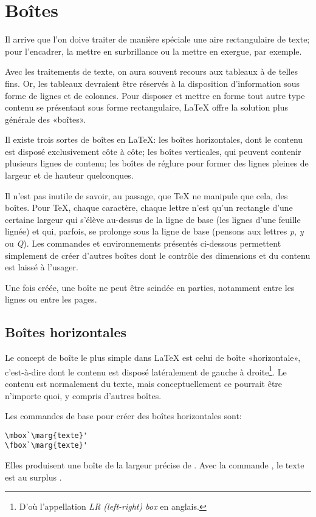 \chapter{Boîtes}
\label{chap:boites}

Il arrive que l'on doive traiter de manière spéciale une aire
rectangulaire de texte; pour l'encadrer, la mettre en surbrillance ou
la mettre en exergue, par exemple.

Avec les traitements de texte, on aura souvent recours aux tableaux à
de telles fins. Or, les tableaux devraient être réservés à la
disposition d'information sous forme de lignes et de colonnes. Pour
disposer et mettre en forme tout autre type contenu se présentant sous
forme rectangulaire, {\LaTeX} offre la solution plus générale des
«boîtes».

Il existe trois sortes de boîtes en {\LaTeX}: les boîtes horizontales,
dont le contenu est disposé exclusivement côte à côte; les boîtes
verticales, qui peuvent contenir plusieurs lignes de contenu; les
boîtes de réglure pour former des lignes pleines de largeur et de
hauteur quelconques.

Il n'est pas inutile de savoir, au passage, que {\TeX} ne manipule que
cela, des boîtes. Pour {\TeX}, chaque caractère, chaque lettre n'est
qu'un rectangle d'une certaine largeur qui s'élève au-dessus de la
ligne de base (les lignes d'une feuille lignée) et qui, parfois, se
prolonge sous la ligne de base (pensons aux lettres \emph{p}, \emph{y}
ou \emph{Q}). Les commandes et environnements présentés ci-dessous
permettent simplement de créer d'autres boîtes dont le contrôle des
dimensions et du contenu est laissé à l'usager.

Une fois créée, une boîte ne peut être scindée en parties, notamment
entre les lignes ou entre les pages.


\section{Boîtes horizontales}
\label{sec:boites:lrbox}

Le concept de boîte le plus simple dans {\LaTeX} est celui de boîte
«horizontale», c'est-à-dire dont le contenu est disposé latéralement
de gauche à droite\footnote{%
  D'où l'appellation \emph{LR (left-right) box} en anglais.}. %
Le contenu est normalement du texte, mais conceptuellement ce pourrait
être n'importe quoi, y compris d'autres boîtes.

Les commandes de base pour créer des boîtes horizontales sont:
\begin{lstlisting}
\mbox`\marg{texte}'
\fbox`\marg{texte}'
\end{lstlisting}
Elles produisent une boîte de la largeur précise de . Avec
la commande \cmd{\fbox}, le texte est au surplus .

